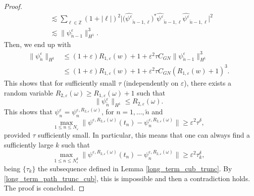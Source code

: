 \documentclass[a4paper]{amsart}
\begin{document}
\begin{proof}
\begin{align*}
&\lesssim \displaystyle\sum_{\ell\in\mathbb{Z}}\left(1+\left|\ell\right|\right)^{2} \big| \big( \widehat{\psi^\varepsilon}_{\tilde{n}-1,\ell} \big)^*\widehat{\psi^\varepsilon}_{\tilde{n}-1,\ell}\widehat{\psi^\varepsilon}_{\tilde{n}-1,\ell}\big|^2\\
&\lesssim \|\psi^\varepsilon_{\tilde{n}-1}\|^3_{H^1}.
\end{align*}
Then, we end up with
\begin{align*}
    \|\psi^\varepsilon_{\tilde{n}}\|_{H^1}&\le (1+\varepsilon)R_{1,\varepsilon}(w)+1+\varepsilon^2\tau C_{GN}  \|\psi^\varepsilon_{\tilde{n}-1}\|^3_{H^1}\\
    &\le  (1+\varepsilon)R_{1,\varepsilon}(w)+1+\varepsilon^2\tau C_{GN} (R_{1,\varepsilon}(w)+1)^3.
\end{align*}
This shows that for sufficiently small $\tau$ (independently on $\varepsilon$), there exists a random variable $R_{2,\varepsilon}(\omega)\ge R_{1,\varepsilon}(\omega)+1$ such that
$$
\|\psi^\varepsilon_{\tilde{n}}\|_{H^1}\le R_{2,\varepsilon}(\omega).
$$
This shows that $\psi^\varepsilon_n=\psi_n^{\varepsilon,R_{2,\varepsilon}(\omega)}$, for $n=1,\dots,\tilde{n}$ and 
$$
\max_{1\le n \le N_\varepsilon} \|\psi^{\varepsilon, R_{2,\varepsilon}(\omega)}(t_n)-\psi^{\varepsilon, R_{2,\varepsilon}(\omega)}_n\|\ge \varepsilon^2 \tau^\delta,
$$
provided $\tau$ sufficiently small. In particular, this means that one can always find a sufficiently large $k$ such that 
$$
\max_{1\le n \le N^k_\varepsilon} \|\psi^{\varepsilon, R_{2,\varepsilon}(\omega)}(t_n)-\psi^{\varepsilon, R_{2,\varepsilon}(\omega)}_n\|\ge \varepsilon^2 \tau_k^\delta,
$$
being $\{\tau_k\}$ the subsequence defined in Lemma \ref{long_term_cub_trunc}. By \eqref{long_term_path_trunc_cub}, this is impossible and then a contradiction holds. The proof is concluded.
\end{proof}
\end{document}
